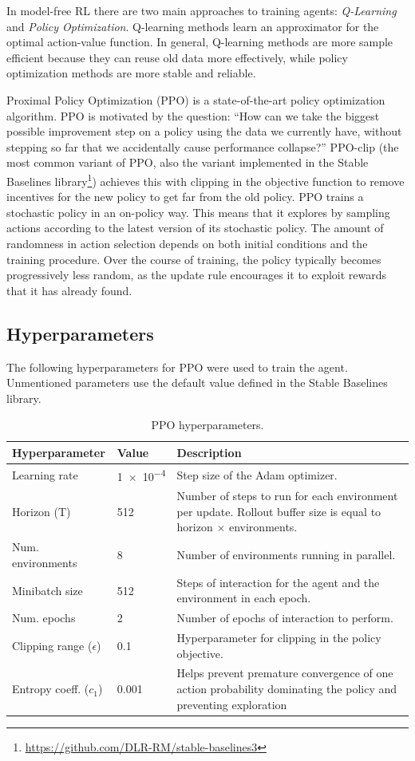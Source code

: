 \documentclass[11pt,a4paper]{article}
\begin{document}
In model-free RL there are two main approaches to training agents: \emph{Q-Learning} and \emph{Policy Optimization}.
Q-learning methods learn an approximator for the optimal action-value function.
In general, Q-learning methods are more sample efficient because they can reuse old data more effectively, while policy optimization methods are more stable and reliable.

Proximal Policy Optimization (PPO) \cite{schulman2017proximal} is a state-of-the-art policy optimization algorithm.
PPO is motivated by the question: ``How can we take the biggest possible improvement step on a policy using the data we currently have, without stepping so far that we accidentally cause performance collapse?''
PPO-clip (the most common variant of PPO, also the variant implemented in the Stable Baselines library\footnote{\url{https://github.com/DLR-RM/stable-baselines3}}) achieves this with clipping in the objective function to remove incentives for the new policy to get far from the old policy.
%
PPO trains a stochastic policy in an on-policy way.
This means that it explores by sampling actions according to the latest version of its stochastic policy.
The amount of randomness in action selection depends on both initial conditions and the training procedure.
Over the course of training, the policy typically becomes progressively less random, as the update rule encourages it to exploit rewards that it has already found.

\subsection{Hyperparameters}
The following hyperparameters for PPO were used to train the agent.
Unmentioned parameters use the default value defined in the Stable Baselines library.
\begin{table}[htbp]
\centering
\begin{tabularx}{\linewidth}{llX}
\toprule
Hyperparameter & Value & Description \tabularnewline
\midrule
Learning rate & \num{1e-4} & Step size of the Adam optimizer. \tabularnewline
Horizon (T) & 512 & Number of steps to run for each environment per update. Rollout buffer size is equal to horizon $\times$ environments. \tabularnewline
Num. environments & 8 & Number of environments running in parallel. \tabularnewline
Minibatch size & 512 & Steps of interaction for the agent and the environment in each epoch. \tabularnewline
Num. epochs & 2 & Number of epochs of interaction to perform. \tabularnewline
Clipping range ($\epsilon$) & 0.1 & Hyperparameter for clipping in the policy objective. \tabularnewline
Entropy coeff. ($c_1$) & 0.001 & Helps prevent premature convergence of one action probability dominating the policy and preventing exploration \tabularnewline
\bottomrule
\end{tabularx}
\caption{PPO hyperparameters.}
\label{table:hyperparams}
\end{table}
\end{document}
